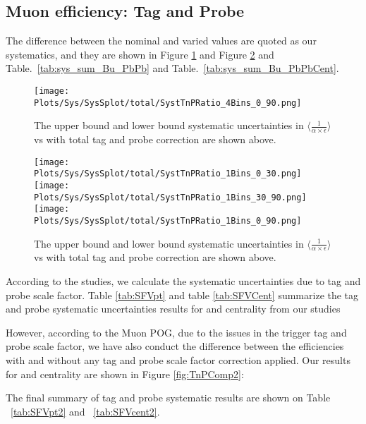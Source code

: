 \subsection{Muon efficiency: Tag and Probe}

\clearpage

The difference between the nominal and varied values are quoted as our systematics, and they are shown in Figure \ref{fig:SystTnpPt} and Figure \ref{fig:SystTnPCent} and Table.~\ref{tab:sys_sum_Bu_PbPb} and Table.~\ref{tab:sys_sum_Bu_PbPbCent}.

\begin{figure}[h]
\centering
\texttt{[image: Plots/Sys/SysSplot/total/SystTnPRatio\_4Bins\_0\_90.png]}
\caption{The upper bound and lower bound systematic uncertainties in $\langle \frac{1}{\alpha \times \epsilon} \rangle$ vs \pt with total tag and probe correction are shown above.}
\label{fig:SystTnpPt}
\end{figure}



\begin{figure}[h]
\centering
\texttt{[image: Plots/Sys/SysSplot/total/SystTnPRatio\_1Bins\_0\_30.png]}
\texttt{[image: Plots/Sys/SysSplot/total/SystTnPRatio\_1Bins\_30\_90.png]}
\texttt{[image: Plots/Sys/SysSplot/total/SystTnPRatio\_1Bins\_0\_90.png]}
\caption{The upper bound and lower bound systematic uncertainties in $\langle \frac{1}{\alpha \times \epsilon} \rangle$ vs \pt with total tag and probe correction are shown above.}
\label{fig:SystTnPCent}
\end{figure}


According to the studies, we calculate the systematic uncertainties due to tag and probe scale factor. Table \ref{tab:SFVpt} and table \ref{tab:SFVCent} summarize the tag and probe systematic uncertainties results for \pt and centrality from our studies 



However, according to the Muon POG, due to the issues in the trigger tag and probe scale factor, we have also conduct the difference between the efficiencies with and without any tag and probe scale factor correction applied. Our results for \pt and centrality are shown in Figure \ref{fig:TnPComp2}:

\clearpage


The final summary of tag and probe systematic results are shown on Table ~\ref{tab:SFVpt2} and ~\ref{tab:SFVcent2}.


